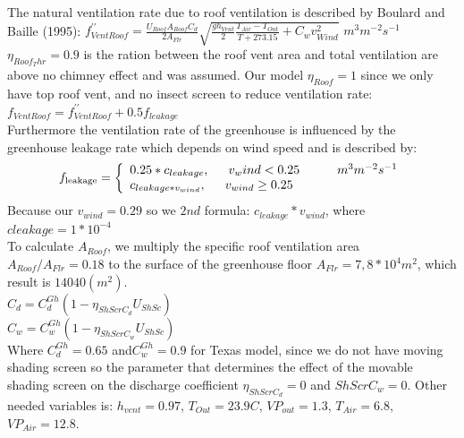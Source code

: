 \indent The natural ventilation  rate due to roof ventilation is described by Boulard and Baille (1995):
$f_{VentRoof}^{\prime \prime} = \frac{U_{Roof}A_{Roof}C_{d}}{2A_{Flr}}\sqrt{\frac{gh_{Vent}}{2}\frac{T_{Air}-T_{Out}}{T+273.15}+C_{w}v_{Wind}^{2}}$ \indent $m^{3}m^{-2}s^{-1}$\\
\indent $\eta_{Roof_Thr}=0.9$ is the ration between the roof vent area and total ventilation are above no chimney effect and was assumed.
\indent Our model $\eta_{Roof}=1$ since we only have top roof vent, and no insect screen to reduce ventilation rate: $f_{VentRoof}=f_{VentRoof}^{\prime \prime}+0.5f_{leakage}$\\
\indent Furthermore the ventilation rate of the greenhouse is influenced by the greenhouse leakage rate which depends on wind speed and is described by:\\
\begin{equation}
f_{\text {leakage}}=\left\{\begin{array}{l}
0.25*c_{leakage}, \indent v_wind < 0.25 \indent \indent m^{3}m^{-2}s^{-1}\\
c_{leakage*v_{wind}}, \indent v_{wind} \geq 0.25
\end{array}\right.
\end{equation}
\indent Because our $v_{wind}=0.29$ so we $2nd$ formula: $c_{leakage}*v_{wind}$, where $c{leakage}=1*10^{-4}$\\
\indent To calculate $A_{Roof}$, we multiply the specific roof ventilation area $A_{Roof}/A_{Flr}=0.18$ to the surface of the greenhouse floor $A_{Flr}=7,8*10^{4} m^{2}$, which result is $14040 (m^{2})$.\\
\indent $C_{d}=C_{d}^{Gh}(1-\eta_{ShScrC_{d}}U_{ShSc})$\\
\indent$C_{w}=C_{w}^{Gh}(1-\eta_{ShScrC_{w}}U_{ShSc})$\\
\indent Where $C_{d}^{Gh}=0.65$ and$C_{w}^{Gh}=0.9$ for Texas model, since we do not have moving shading screen so the parameter that determines the effect of the movable shading screen on the discharge coefficient $\eta_{ShScrC_{d}} = 0$ and ${ShScrC_{w}}=0$. Other needed variables is: $h_{vent}= 0.97$, $T_{Out}= 23.9 C$, $VP_{out}=1.3$, $T_{Air}=6.8$, $VP_{Air}=12.8$.\\